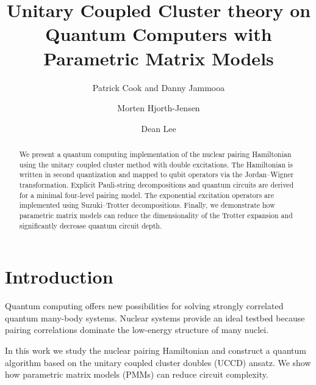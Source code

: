 \documentclass[twocolumn,superscriptaddress,unsortedaddress,nofootinbib,amsmath,amssymb,
aps,floatfix]{revtex4-2}
\begin{document}
\title{Unitary Coupled Cluster theory on Quantum Computers with Parametric Matrix Models}
\author{Patrick Cook and Danny Jammooa}
\author{Morten Hjorth-Jensen}
\author{Dean Lee}



\begin{abstract}

We present a quantum computing implementation of the nuclear pairing
Hamiltonian using the unitary coupled cluster method with double
excitations. The Hamiltonian is written in second quantization and
mapped to qubit operators via the Jordan--Wigner transformation.
Explicit Pauli-string decompositions and quantum circuits are derived
for a minimal four-level pairing model. The exponential excitation
operators are implemented using Suzuki--Trotter decompositions.
Finally, we demonstrate how parametric matrix models can reduce the
dimensionality of the Trotter expansion and significantly decrease
quantum circuit depth.

\end{abstract}

\maketitle


\section{Introduction}

Quantum computing offers new possibilities for solving strongly
correlated quantum many-body systems. Nuclear systems provide an
ideal testbed because pairing correlations dominate the low-energy
structure of many nuclei.

In this work we study the nuclear pairing Hamiltonian and construct
a quantum algorithm based on the unitary coupled cluster doubles
(UCCD) ansatz. We show how parametric matrix models (PMMs) can
reduce circuit complexity.

\end{document}
